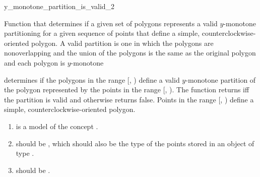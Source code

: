 \renewcommand\ccRefPageBegin{\ccParDims\cgalColumnLayout\begin{ccAdvanced}}
\renewcommand\ccRefPageEnd{\ccParDims\cgalColumnLayout\end{ccAdvanced}}
\begin{ccRefFunction}{y_monotone_partition_is_valid_2}

\ccDefinition
Function that determines if a given set of polygons represents
a valid $y$-monotone partitioning for a given sequence of points that 
define a simple, counterclockwise-oriented polygon.  
A valid partition is one in
which the polygons are nonoverlapping and the union of the polygons is the 
same as the original polygon and each polygon is $y$-monotone


{
determines if the polygons in the range [, )
define a valid $y$-monotone partition of the polygon represented by the points 
in the range [, ). 
The function returns  iff the partition is valid and otherwise
returns false.
\ccPrecond  Points in the range [, ) define
a simple, counterclockwise-oriented polygon.
}

\begin{enumerate}
    \item {} is a model of the concept 
          .
    \item {} should be ,
          which should also be the type of the points stored in an object
          of type .
    \item {} should be 
          .
\end{enumerate}


\end{ccRefFunction}
